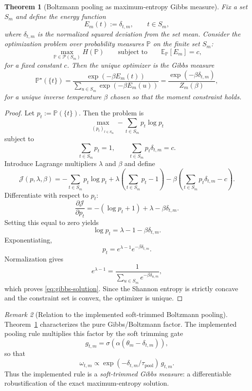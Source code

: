 \documentclass{article}
\theoremstyle{plain}
\newtheorem{theorem}{Theorem}[section]
\theoremstyle{definition}
\theoremstyle{remark}
\newtheorem{remark}[theorem]{Remark}
\begin{document}
\begin{theorem}[Boltzmann pooling as maximum-entropy Gibbs measure]
\label{thm:boltzmann-maxent}
Fix a set $S_m$ and define the energy function
\[
E_m(t) := \delta_{t,m}, \qquad t\in S_m,
\]
where $\delta_{t,m}$ is the normalized squared deviation from the set mean. Consider the optimization problem over probability measures $\mathbb{P}$ on the finite set $S_m$:
\begin{equation}
\label{eq:maxent-gibbs-problem}
\max_{\mathbb{P}\in \mathcal{P}(S_m)}
H(\mathbb{P})
\qquad
\text{subject to}
\qquad
\mathbb{E}_{\mathbb{P}}[E_m] = c,
\end{equation}
for a fixed constant $c$. Then the unique optimizer is the Gibbs measure
\begin{equation}
\label{eq:gibbs-solution}
\mathbb{P}^{\star}(\{t\})
=
\frac{\exp(-\beta E_m(t))}
{\sum_{u\in S_m}\exp(-\beta E_m(u))}
=
\frac{\exp(-\beta \delta_{t,m})}
{Z_m(\beta)},
\end{equation}
for a unique inverse temperature $\beta$ chosen so that the moment constraint holds.
\end{theorem}

\begin{proof}
Let $p_t:=\mathbb{P}(\{t\})$. Then the problem is
\[
\max_{(p_t)_{t\in S_m}}
-\sum_{t\in S_m} p_t \log p_t
\]
subject to
\[
\sum_{t\in S_m} p_t = 1,
\qquad
\sum_{t\in S_m} p_t \delta_{t,m}=c.
\]
Introduce Lagrange multipliers $\lambda$ and $\beta$ and define
\[
\mathcal{J}(p,\lambda,\beta)
=
-\sum_{t\in S_m} p_t\log p_t
+
\lambda\left(\sum_{t\in S_m}p_t-1\right)
-
\beta\left(\sum_{t\in S_m} p_t\delta_{t,m}-c\right).
\]
Differentiate with respect to $p_t$:
\[
\frac{\partial \mathcal{J}}{\partial p_t}
=
-(\log p_t +1)+\lambda-\beta \delta_{t,m}.
\]
Setting this equal to zero yields
\[
\log p_t = \lambda -1 - \beta\delta_{t,m}.
\]
Exponentiating,
\[
p_t = e^{\lambda-1} e^{-\beta\delta_{t,m}}.
\]
Normalization gives
\[
e^{\lambda-1}
=
\frac{1}{\sum_{u\in S_m} e^{-\beta\delta_{u,m}}},
\]
which proves \eqref{eq:gibbs-solution}. Since the Shannon entropy is strictly concave and the constraint set is convex, the optimizer is unique.
\end{proof}

\begin{remark}[Relation to the implemented soft-trimmed Boltzmann pooling]
\label{rem:soft-trimmed-boltzmann}
Theorem~\ref{thm:boltzmann-maxent} characterizes the pure Gibbs/Boltzmann factor. The implemented pooling rule multiplies this factor by the soft trimming gate
\[
g_{t,m}=\sigma\!\left(\alpha(\theta_m-\delta_{t,m})\right),
\]
so that
\[
\omega_{t,m}
\propto
\exp(-\delta_{t,m}/\tau_{\mathrm{pool}})\,g_{t,m}.
\]
Thus the implemented rule is a \emph{soft-trimmed Gibbs measure}: a differentiable robustification of the exact maximum-entropy solution.
\end{remark}
\end{document}
